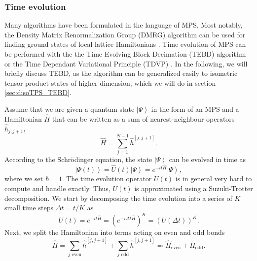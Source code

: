 \subsubsection*{Time evolution}
Many algorithms have been formulated in the language of MPS. Most notably, the Density Matrix Renormalization Group (DMRG) algorithm can be used for finding ground states of local lattice Hamiltonians \cite{cite:DMRG_in_the_age_of_MPS}. Time evolution of MPS can be performed with the the Time Evolving Block Decimation (TEBD) algorithm \cite{cite:efficient_simulation_of_1D_quantum_many_body_systems, cite:matrix_product_density_operators_simulation_of_finite_temperature_and_dissipative_systems} or the Time Dependant Variational Principle (TDVP) \cite{cite:time_dependent_variational_principle_for_quantum_lattices, cite:unifying_time_evolution_and_optimization_with_MPS}. In the following, we will briefly discuss TEBD, as the algorithm can be generalized easily to isometric tensor product states of higher dimension, which we will do in section \ref{sec:disoTPS_TEBD}. \par
Assume that we are given a quantum state $\left|\Psi\right\rangle$ in the form of an MPS and a Hamiltonian $\hat{H}$ that can be written as a sum of nearest-neighbour operators $\hat{h}_{j,j+1}$,
\begin{equation}
	\hat{H} = \sum_{j = 1}^{N-1} \hat{h}^{[j,j+1]}.
\end{equation}
According to the Schrödinger equation, the state $\left|\Psi\right\rangle$ can be evolved in time as
\begin{equation}
	\left|\Psi(t)\right\rangle = \hat{U}\left(t\right) \left|\Psi\right\rangle = e^{-it\hat{H}} \left|\Psi\right\rangle,
\end{equation}
where we set $\hbar = 1$. The time evolution operator $U(t)$ is in general very hard to compute and handle exactly. Thus, $U(t)$ is approximated using a Suzuki-Trotter decomposition. We start by decomposing the time evolution into a series of $K$ small time steps $\Delta t = t/K$ as
\begin{equation}
	U(t) = e^{-it\hat{H}} = \left(e^{-i\Delta t\hat{H}}\right)^K = \left(U(\Delta t)\right)^K.
\end{equation}
Next, we split the Hamiltonian into terms acting on even and odd bonds
\begin{equation}
	\hat{H} = \sum_{j \text{ even}}\hat{h}^{[j, j+1]} + \sum_{j \text{ odd}}\hat{h}^{[j, j+1]} \eqqcolon \hat{H}_\text{even} + \hat{H}_\text{odd}.
\end{equation}
